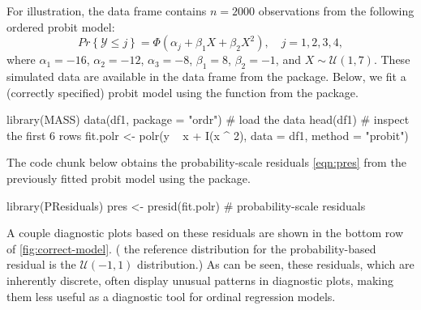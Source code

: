 For illustration, the data frame  contains $n = 2000$ observations from the following ordered probit model:
\begin{equation}
\label{eqn:quadratic}
  Pr\left\{\mathcal{Y} \le j\right\} = \Phi\left(\alpha_j + \beta_1 X + \beta_2 X ^ 2\right), \quad j = 1, 2, 3, 4,
\end{equation}
where $\alpha_1 = -16$, $\alpha_2 = -12$, $\alpha_3 = -8$, $\beta_1 = 8$, $\beta_2 = -1$, and $X \sim \mathcal{U}\left(1, 7\right)$. These simulated data are available in the  data frame from the  package. Below, we fit a (correctly specified) probit model using the  function from the  package.
\begin{example}
library(MASS)
data(df1, package = "ordr")  # load the data
head(df1)  # inspect the first 6 rows
fit.polr <- polr(y ~ x + I(x ^ 2), data = df1, method = "probit")
\end{example}

The code chunk below obtains the probability-scale residuals \eqref{eqn:pres} from the previously fitted probit model  using the  package.
\begin{example}
library(PResiduals)
pres <- presid(fit.polr)  # probability-scale residuals
\end{example}
A couple diagnostic plots based on these residuals are shown in the bottom row of \ref{fig:correct-model}. ( the reference distribution for the probability-based residual is the $\mathcal{U}\left(-1, 1\right)$ distribution.) As can be seen, these residuals, which are inherently discrete, often display unusual patterns in diagnostic plots, making them less useful as a diagnostic tool for ordinal regression models.

